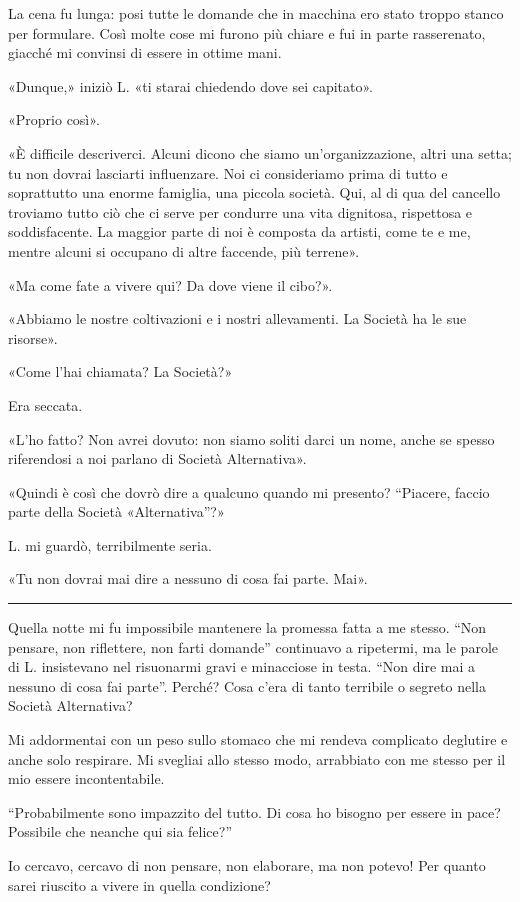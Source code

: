 La cena fu lunga: posi tutte le domande che in macchina ero stato troppo stanco per formulare. Così
molte cose mi furono più chiare e fui in parte rasserenato, giacché mi convinsi di essere in ottime
mani.

«Dunque,» iniziò L. «ti starai chiedendo dove sei capitato».

«Proprio così».

«È difficile descriverci. Alcuni dicono che siamo un'organizzazione, altri una setta; tu non dovrai
lasciarti influenzare. Noi ci consideriamo prima di tutto e soprattutto una enorme famiglia, una
piccola società. Qui, al di qua del cancello troviamo tutto ciò che ci serve per condurre una vita
dignitosa, rispettosa e soddisfacente. La maggior parte di noi è composta da artisti, come te e me,
mentre alcuni si occupano di altre faccende, più terrene».

«Ma come fate a vivere qui? Da dove viene il cibo?».

«Abbiamo le nostre coltivazioni e i nostri allevamenti. La Società ha le sue risorse».

«Come l'hai chiamata? La Società?»

Era seccata.

«L'ho fatto? Non avrei dovuto: non siamo soliti darci un nome, anche se spesso riferendosi a noi
parlano di Società Alternativa».

«Quindi è così che dovrò dire a qualcuno quando mi presento? ``Piacere, faccio parte della Società
«Alternativa''?»

L. mi guardò, terribilmente seria.

«Tu non dovrai mai dire a nessuno di cosa fai parte. Mai».

\plainbreak{1}

Quella notte mi fu impossibile mantenere la promessa fatta a me stesso. ``Non pensare, non
riflettere, non farti domande'' continuavo a ripetermi, ma le parole di L. insistevano nel
risuonarmi gravi e minacciose in testa. ``Non dire mai a nessuno di cosa fai parte''. Perché? Cosa
c'era di tanto terribile o segreto nella Società Alternativa?

Mi addormentai con un peso sullo stomaco che mi rendeva complicato deglutire e anche solo respirare.
Mi svegliai allo stesso modo, arrabbiato con me stesso per il mio essere incontentabile.

``Probabilmente sono impazzito del tutto. Di cosa ho bisogno per essere in pace? Possibile che
neanche qui sia felice?''

Io cercavo, cercavo di non pensare, non elaborare, ma non potevo! Per quanto sarei riuscito a vivere
in quella condizione?

